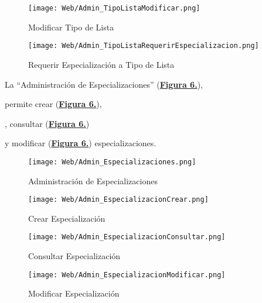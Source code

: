 \begin{figure}[!htbp]
  \centering
  \texttt{[image: Web/Admin\_TipoListaModificar.png]}
  \caption{Modificar Tipo de Lista}
  \label{fig:Web_Admin_TipoListaModificar}
\end{figure}
\FloatBarrier

\begin{figure}[!htbp]
  \centering
  \texttt{[image: Web/Admin\_TipoListaRequerirEspecializacion.png]}
  \caption{Requerir Especialización a Tipo de Lista}
  \label{fig:Web_Admin_TipoListaRequerirEspecializacion}
\end{figure}
\FloatBarrier

\pagebreak \addtocounter{figura_manual}{1} La ``Administración de Especializaciones''  (\textbf{\hyperref[fig:Web_Admin_Especializaciones]{Figura 6.}}),\addtocounter{figura_manual}{1} permite crear (\textbf{\hyperref[fig:Web_Admin_EspecializacionCrear]{Figura 6.}}), \addtocounter{figura_manual}{1}, consultar (\textbf{\hyperref[fig:Web_Admin_EspecializacionConsultar]{Figura 6.}})\addtocounter{figura_manual}{1} y modificar (\textbf{\hyperref[fig:Web_Admin_EspecializacionModificar]{Figura 6.}}) especializaciones.
\begin{figure}[!htbp]
  \centering
  \texttt{[image: Web/Admin\_Especializaciones.png]}
  \caption{Administración de Especializaciones}
  \label{fig:Web_Admin_Especializaciones}
\end{figure}
\FloatBarrier

\begin{figure}[!htbp]
  \centering
  \texttt{[image: Web/Admin\_EspecializacionCrear.png]}
  \caption{Crear Especialización}
  \label{fig:Web_Admin_EspecializacionCrear}
\end{figure}
\FloatBarrier

\begin{figure}[!htbp]
  \centering
  \texttt{[image: Web/Admin\_EspecializacionConsultar.png]}
  \caption{Consultar Especialización}
  \label{fig:Web_Admin_EspecializacionConsultar}
\end{figure}
\FloatBarrier

\begin{figure}[!htbp]
  \centering
  \texttt{[image: Web/Admin\_EspecializacionModificar.png]}
  \caption{Modificar Especialización}
  \label{fig:Web_Admin_EspecializacionModificar}
\end{figure}
\FloatBarrier

